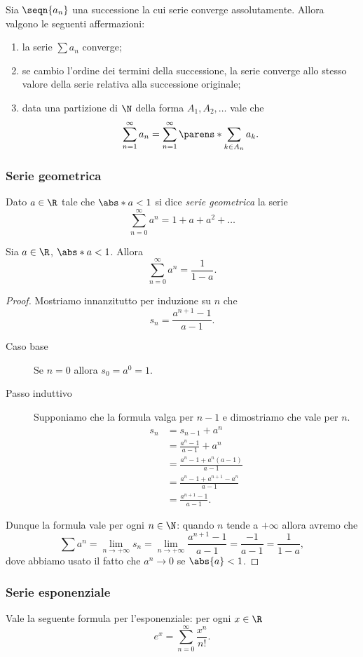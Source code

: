 \begin{proposition}
    Sia $\seqn{a_n}$ una successione la cui serie converge assolutamente. Allora valgono le seguenti affermazioni: \begin{enumerate}[label={(\roman*)}]
        \item la serie $\sum a_n$ converge;
        \item se cambio l'ordine dei termini della successione, la serie converge allo stesso valore della serie relativa alla successione originale;
        \item data una partizione di $\N$ della forma $A_1, A_2, \dots$ vale che \[
            \sum_{n=1}^\infty a_n = \sum_{n=1}^\infty \parens*{\sum_{k \in A_n} a_k}.
        \]
    \end{enumerate}
\end{proposition}

\subsubsection{Serie geometrica}

Dato $a \in \R$ tale che $\abs*{a}< 1$ si dice \emph{serie geometrica} la serie \[
    \sum_{n=0}^\infty a^n = 1 + a + a^2 + \dots    
\]

\begin{proposition}
    Sia $a \in \R$, $\abs*{a} < 1$. Allora \begin{equation}\label{eq:geometric_series}
        \sum_{n = 0}^\infty a^n = \frac{1}{1-a}.
    \end{equation}
\end{proposition}
\begin{proof}
    Mostriamo innanzitutto per induzione su $n$ che \[
        s_n = \frac{a^{n+1} - 1}{a - 1}.    
    \]
    \begin{description}
        \item[Caso base] Se $n = 0$ allora $s_0 = a^0 = 1$.
        \item[Passo induttivo] Supponiamo che la formula valga per $n-1$ e dimostriamo che vale per $n$.
        \begin{align*}
            s_{n} &= s_{n - 1} + a^{n}\\
            &= \frac{a^n - 1}{a - 1} + a^n\\
            &= \frac{a^n - 1 + a^n(a - 1)}{a - 1}\\
            &= \frac{a^n - 1 + a^{n+1} - a^n}{a-1}\\
            &= \frac{a^{n+1} - 1}{a-1}.
        \end{align*}  
    \end{description}
    Dunque la formula vale per ogni $n \in \N$: quando $n$ tende a $+\infty$ allora avremo che \[
        \sum a^n = \lim_{n \to +\infty} s_n = \lim_{n \to +\infty} \frac{a^{n+1} - 1}{a-1} = \frac{-1}{a-1} = \frac{1}{1-a},   
    \] dove abbiamo usato il fatto che $a^n \to 0$ se $\abs{a} < 1$.
\end{proof}

\subsubsection{Serie esponenziale}
Vale la seguente formula per l'esponenziale: per ogni $x \in \R$ \begin{equation}
    \label{eq:exp_series}
    e^x = \sum_{n=0}^\infty \frac{x^n}{n!}.
\end{equation}